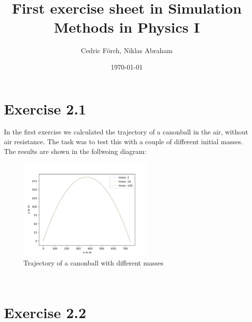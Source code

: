 \documentclass[a4paper,11pt,bibtotoc]{scrartcl}
\begin{document}
\titlehead{Simulation Methods in Physics I \hfill WS 2021/2022}
\title{First exercise sheet in Simulation Methods in Physics I}
\author{Cedric Förch, Niklas Abraham}
\date{\today}
\publishers{Institute for Computational Physics, University of
  Stuttgart}
\maketitle

\tableofcontents

\section{Exercise 2.1}

In the first exercise we calculated the trajectory of a canonball in the air, without air resistance.
The task was to test this with a couple of different initial masses. The results are shown in the follwoing diagram:
\begin{figure}[!htbp]
	\centering
	\includegraphics[width=0.6\textwidth]{ex_1.png}
	\caption{Trajectory of a canonball with different masses}
	\label{fig:ex_1}
\end{figure}
\\


\section{Exercise 2.2}
\end{document}
